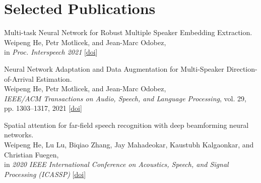 \documentclass[a4paper,9pt]{extarticle} %
\begin{document}

\section{Selected Publications}
\begin{enumerate}[label={[\arabic*]}]

  \item Multi-task Neural Network for Robust Multiple Speaker Embedding Extraction. \\
        Weipeng He, Petr Motlicek, and Jean-Marc Odobez, \\
        in \textit{Proc. Interspeech 2021}
        [\href{https://doi.org/10.21437/Interspeech.2021-1769}{doi}]

  \item Neural Network Adaptation and Data Augmentation for Multi-Speaker Direction-of-Arrival Estimation. \\
        Weipeng He, Petr Motlicek, and Jean-Marc Odobez, \\
        \textit{IEEE/ACM Transactions on Audio, Speech, and Language Processing}, vol. 29, pp. 1303–1317, 2021
        [\href{https://doi.org/10.1109/TASLP.2021.3060257}{doi}]


  \item Spatial attention for far-field speech recognition with deep beamforming neural networks. \\
        Weipeng He, Lu Lu, Biqiao Zhang, Jay Mahadeokar, Kaustubh Kalgaonkar, and Christian Fuegen, \\
        in \textit{2020 IEEE International Conference on Acoustics, Speech, and Signal Processing (ICASSP)}
        [\href{https://doi.org/10.1109/ICASSP40776.2020.9053439}{doi}]


\end{enumerate}
\end{document}
